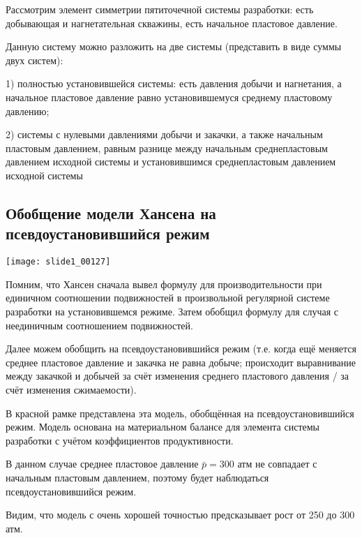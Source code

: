 \documentclass[main.tex]{subfiles}
\begin{document}

Рассмотрим элемент симметрии пятиточечной системы разработки: есть добывающая и нагнетательная скважины, есть начальное пластовое давление.

Данную систему можно разложить на две системы (представить в виде суммы двух систем):

1) полностью установившейся системы: есть давления добычи и нагнетания, а начальное пластовое давление равно установившемуся среднему пластовому давлению;

2) системы с нулевыми давлениями добычи и закачки, а также начальным пластовым давлением, равным разнице между начальным среднепластовым давлением исходной системы и установившимся среднепластовым давлением исходной системы

\subsection{Обобщение модели Хансена на псевдоустановившийся режим}

\texttt{[image: slide1\_00127]}


Помним, что Хансен сначала вывел формулу для производительности при единичном соотношении подвижностей в произвольной регулярной системе разработки на установившемся режиме. Затем обобщил формулу для случая с неединичным соотношением подвижностей.

Далее можем обобщить на псевдоустановившийся режим (т.е. когда ещё меняется среднее пластовое давление и закачка не равна добыче; происходит выравнивание между закачкой и добычей за счёт изменения среднего пластового давления / за счёт изменения сжимаемости).

В красной рамке представлена эта модель, обобщённая на псевдоустановившийся режим. Модель основана на материальном балансе для элемента системы разработки с учётом коэффициентов продуктивности.



В данном случае среднее пластовое давление $\bar{p}=300\text{ атм}$ не совпадает с начальным пластовым давлением, поэтому будет наблюдаться псевдоустановившийся режим.

Видим, что модель с очень хорошей точностью предсказывает рост от 250 до 300 атм.

\end{document}

